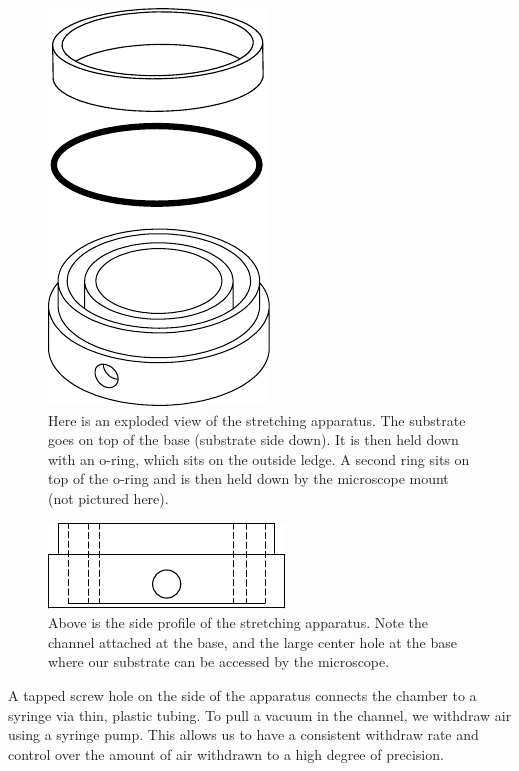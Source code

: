 \begin{figure}[h!]
	\centering
	\includegraphics[width=.5\linewidth]{Chapters/Figures/exploded_stretcher}
	\caption[Stretching Apparatus Design]{Here is an exploded view of the stretching apparatus. The substrate goes on top of the base (substrate side down). It is then held down with an o-ring, which sits on the outside ledge. A second ring sits on top of the o-ring and is then held down by the microscope mount (not pictured here).}
	\label{fig:explodedstretcher}
\end{figure}
\begin{figure}
	\centering
	\includegraphics[width=0.7\linewidth]{Chapters/Figures/stretcher_side}
	\caption[Side Profile of Stretching Apparatus]{Above is the side profile of the stretching apparatus. Note the channel attached at the base, and the large center hole at the base where our substrate can be accessed by the microscope.}
	\label{fig:stretcherside}
\end{figure}


A tapped screw hole on the side of the apparatus connects the chamber to a syringe via thin, plastic tubing. To pull a vacuum in the channel, we withdraw air using a syringe pump. This allows us to have a consistent withdraw rate and control over the amount of air withdrawn to a high degree of precision.

